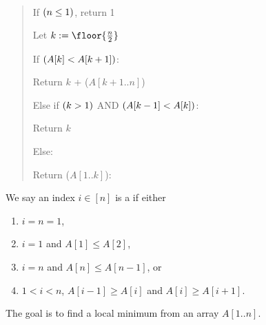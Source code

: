 \documentclass[10pt]{article}
\newcommand{\parof}[1]{\mleft( #1 \mright)}
\begin{document}
\begin{solution}\ %
\begin{quote}%
\noindent{}%


\begin{steps}
\item If \( \parof{n \leq 1} \), return 1
  \item Let \( k := \floor{\frac{n}{2}} \)
  \item If \( \parof{A[k] < A[k + 1]} \): %
    \begin{steps}
    \item Return \( k \) + (\( A[k+1..n]\))
    \end{steps}
  \item Else if \( \parof{k > 1} \) AND \( \parof{ A[k-1] < A[k] } \):
    \begin{steps}
    \item Return \( k \)
    \end{steps}
  \item Else:
    \begin{steps}
    \item Return (\( A[1..k] \)):
    \end{steps}
\end{steps}
\end{quote}
\end{solution}
\pagebreak

We say an index \( i \in [n] \) is a  if either
\begin{enumerate}[label=(\alph*)]
  \item \( i = n = 1 \),
  \item \( i = 1 \) and \( A[1] \leq A[2] \),
  \item \( i = n \) and \( A[n] \leq A[n-1] \), or
  \item \( 1 < i < n \), \( A[i-1] \geq A[i] \) and \( A[i] \geq A[i + 1] \).
\end{enumerate}
The goal is to find a local minimum from an array \( A[1..n] \).
\end{document}
